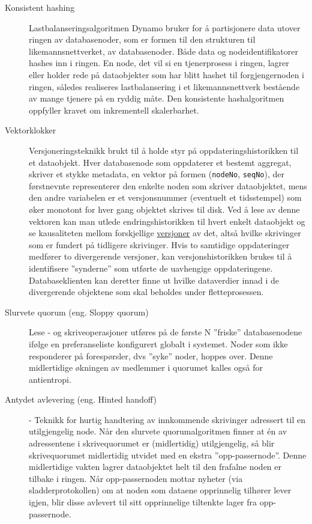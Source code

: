 \begin{description}
  \item [Konsistent hashing] Lastbalanseringsalgoritmen Dynamo bruker for å partisjonere data utover ringen av databasenoder, som er formen til den strukturen til likemannsnettverket, av databasenoder. Både data og nodeidentifikatorer hashes inn i ringen. En node, det vil si en tjenerprosess i ringen, lagrer eller holder rede på dataobjekter som har blitt hashet til forgjengernoden i ringen, således realiseres lastbalansering i et likemannsnettverk bestående av mange tjenere på en ryddig måte. Den konsistente hashalgoritmen oppfyller kravet om inkrementell skalerbarhet.
  \item [Vektorklokker] Versjoneringsteknikk brukt til å holde styr på oppdateringshistorikken til et dataobjekt. Hver databasenode som oppdaterer et bestemt aggregat, skriver et stykke metadata, en vektor på formen (\texttt{nodeNo}, \texttt{seqNo}), der førstnevnte representerer den enkelte noden som skriver dataobjektet, mens den andre variabelen er et versjonsnummer (eventuelt et tidsstempel) som øker monotont for hver gang objektet skrives til disk. Ved å lese av denne vektoren kan man utlede endringshistorikken til hvert enkelt dataobjekt og se kausaliteten mellom forskjellige \underline{versjoner} av det, altså hvilke skrivinger som er fundert på tidligere skrivinger. Hvis to samtidige oppdateringer medfører to divergerende versjoner, kan versjonshistorikken brukes til å identifisere ''synderne'' som utførte de uavhengige oppdateringene. Databaseklienten kan deretter finne ut hvilke dataverdier innad i de divergerende objektene som skal beholdes under fletteprosessen.
  \item [Slurvete quorum (eng. Sloppy quorum)] Lese - og skriveoperasjoner utføres på de første N ''friske'' databasenodene ifølge en preferanseliste konfigurert globalt i systemet. Noder som ikke responderer på forespørsler, dvs ''syke'' noder, hoppes over. Denne midlertidige økningen av medlemmer i quorumet kalles også for antientropi.
  \item [Antydet avlevering (eng. Hinted handoff)] - Teknikk for hurtig handtering av innkommende skrivinger adressert til en utilgjengelig node. Når den slurvete quorumalgoritmen finner at én av adressentene i skrivequorumet er (midlertidig) utilgjengelig, så blir skrivequorumet midlertidig utvidet med en ekstra ''opp-passernode''. Denne midlertidige vakten lagrer dataobjektet helt til den frafalne noden er tilbake i ringen. Når opp-passernoden mottar nyheter (via sladderprotokollen) om at noden som dataene opprinnelig tilhører lever igjen, blir disse avlevert til sitt opprinnelige tiltenkte lager fra opp-passernode. %

\end{description}
